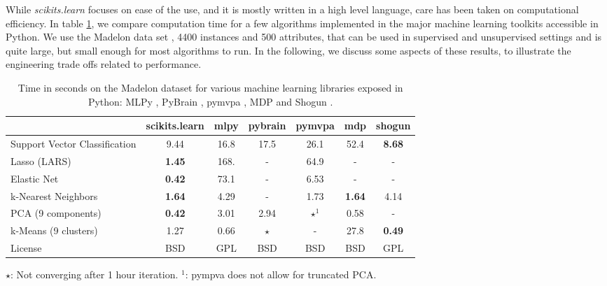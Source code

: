 \documentclass[twoside,11pt]{article}
\begin{document}

While \emph{scikits.learn} focuses on ease of the use, and it is
mostly written in a high level language, care has been taken on
computational efficiency. In table \ref{tab:comparisons}, we compare
computation time for a few algorithms implemented in the major machine
learning toolkits accessible in Python. We use the Madelon data
set \citep{Guyon2004}, 4400 instances and 500 attributes,
that can be used in supervised
and unsupervised settings and is quite large, but small enough for most
algorithms to run.
%
%
In the following, we discuss some aspects of these results, to illustrate
the engineering trade offs related to performance. 

\begin{table}[b]
\small
\hspace*{.03\linewidth}%
\begin{tabular}{l c c c c c c}
\hline\hline %
 & scikits.learn & mlpy & pybrain & pymvpa &  mdp & shogun \\ [0.5ex]
\hline
Support Vector Classification & 9.44 & 16.8 & 17.5 & 26.1 & 52.4 & {\bf 8.68} \\
Lasso (LARS) & {\bf 1.45} & 168.   & -       &  64.9     & -    & - \\
Elastic Net & {\bf 0.42} & 73.1 & -  &  6.53  & -  & - \\
k-Nearest Neighbors & {\bf 1.64} & 4.29 & - &  1.73 & {\bf 1.64} & 4.14 \\
PCA (9 components) & {\bf 0.42} & 3.01  & 2.94  & $\star^1$ & 0.58  & - \\
k-Means (9 clusters) & 1.27 & 0.66 & $\star$ & -  & 27.8 & {\bf 0.49} \\
License &  BSD & GPL & BSD  &  BSD  & BSD  & GPL \\
\hline
\end{tabular}

$\star$: Not converging after 1 hour iteration. \hfill $^1$: pympva does
not allow for truncated PCA. \\

\vspace*{-1.5ex}
\caption{\small
Time in seconds on the Madelon dataset for various machine learning libraries exposed in Python:
MLPy \citep{albanese2008}, PyBrain \citep{schaul2010}, pymvpa
\citep{hanke2009}, MDP \citep{zito2008} and Shogun
\citep{sonnenburg2010}. \label{tab:comparisons}
\vspace*{-1.5em}
}
\end{table}
\end{document}
